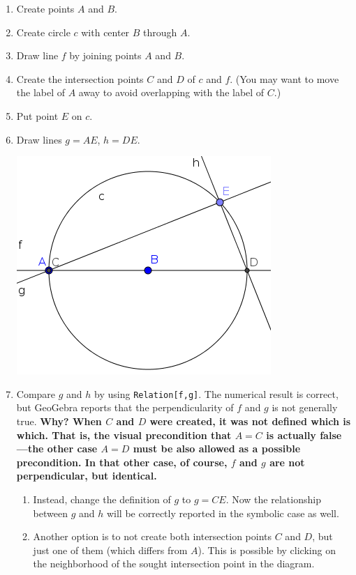 \documentclass{article}
\begin{document}
\begin{enumerate}
    \item Create points $A$ and $B$.
    \item Create circle $c$ with center $B$ through $A$.
    \item Draw line $f$ by joining points $A$ and $B$.
    \item Create the intersection points $C$ and $D$ of $c$ and $f$. (You may want to move the label of $A$ away to avoid overlapping with the label of $C$.)
    \item Put point $E$ on $c$.
    \item Draw lines $g=AE$, $h=DE$.
\begin{center}
\includegraphics[scale=0.5]{limitations-Thales2-2}
\end{center}
    \item Compare $g$ and $h$ by using \texttt{Relation[f,g]}. The numerical result is correct, but GeoGebra reports that the perpendicularity of $f$ and $g$ is not generally true. \textbf{Why? When $C$ and $D$ were created, it was not defined which is which. That is, the visual precondition that $A=C$ is actually false---the other case $A=D$ must be also allowed as a possible precondition. In that other case, of course, $f$ and $g$ are not perpendicular, but identical.}
\begin{enumerate}
      \item Instead, change the definition of $g$ to $g=CE$. Now the relationship between $g$ and $h$ will be correctly reported in the symbolic case as well.
      \item Another option is to not create both intersection points $C$ and $D$, but just one of them (which differs from $A$). This is possible by clicking on the neighborhood of the sought intersection point in the diagram.

\end{enumerate}
\end{enumerate}
\end{document}
